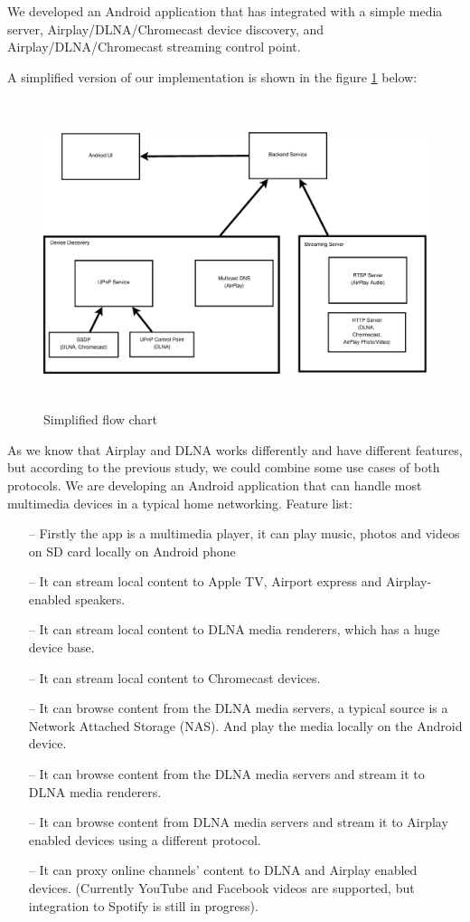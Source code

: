 
We developed an Android application that has integrated with a simple media server, 
Airplay/DLNA/Chromecast device discovery, and Airplay/DLNA/Chromecast streaming
control point.

A simplified version of our implementation is shown in the figure \ref{chart3} below:
\begin{figure}[htb]
\centering \includegraphics[height=9cm]{charts/chart3}
\caption{Simplified flow chart \label{chart3}}
\end{figure}

As we know that Airplay and DLNA works differently and have different features, but 
according to the previous study, we could combine some use cases of both protocols. 
We are developing an Android application that can handle most multimedia devices in 
a typical home networking. Feature list:

\begin{itemize}
\item[--]Firstly the app is a multimedia player, it can play music, photos and videos 
on SD card locally on Android phone
\item[--]It can stream local content to Apple TV, Airport express and Airplay-enabled 
speakers.
\item[--]It can stream local content to DLNA media renderers, which has a huge device 
base.
\item[--]It can stream local content to Chromecast devices.
\item[--]It can browse content from the DLNA media servers, a typical source is a 
Network Attached Storage (NAS). And play the media locally on the Android device.
\item[--]It can browse content from the DLNA media servers and stream it to DLNA media 
renderers.
\item[--]It can browse content from DLNA media servers and stream it to Airplay enabled 
devices using a different protocol.
\item[--]It can proxy online channels' content to DLNA and Airplay enabled devices. 
(Currently YouTube and Facebook videos are supported, but integration to Spotify is still 
in progress).
\end{itemize}